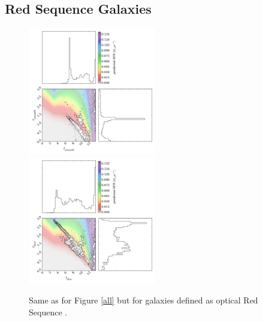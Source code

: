 \documentclass{mn2e}
\begin{document}
\subsection{Red Sequence Galaxies}

\begin{figure}
\includegraphics[width=0.4975\textwidth]{red_s_smooth.pdf}
\includegraphics[width=0.4975\textwidth]{red_s_disc.pdf}
\caption[8pt]{Same as for Figure \ref{all} but for galaxies defined as optical Red Sequence \cite{Baldry}.}
\label{red_s}
\end{figure}
\end{document}
